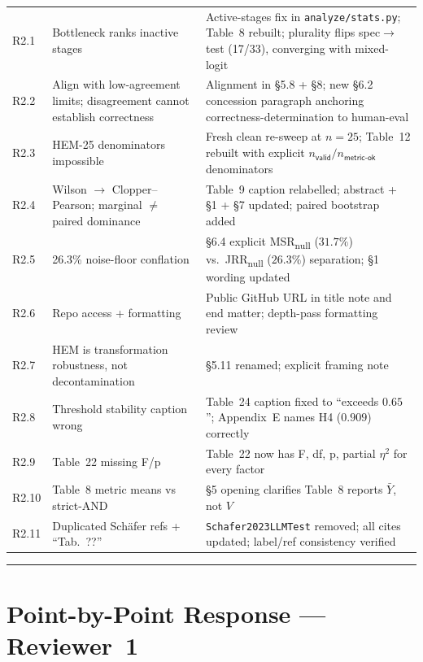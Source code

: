 \documentclass[11pt,a4paper]{article}
\begin{document}
\begin{tabular}{@{}p{0.6cm}p{5.8cm}p{9cm}@{}}
\addlinespace
R2.1 & Bottleneck ranks inactive stages & Active-stages fix in \texttt{analyze/stats.py}; Table~8 rebuilt; plurality flips spec$\to$test (17/33), converging with mixed-logit \\
R2.2 & Align with low-agreement limits; disagreement cannot establish correctness & Alignment in \S5.8 + \S8; new \S6.2 concession paragraph anchoring correctness-determination to human-eval \\
R2.3 & HEM-25 denominators impossible & Fresh clean re-sweep at $n = 25$; Table~12 rebuilt with explicit $n_{\textsf{valid}} / n_{\textsf{metric-ok}}$ denominators \\
R2.4 & Wilson $\to$ Clopper--Pearson; marginal $\ne$ paired dominance & Table~9 caption relabelled; abstract + \S1 + \S7 updated; paired bootstrap added \\
R2.5 & 26.3\% noise-floor conflation & \S6.4 explicit MSR\textsubscript{null} ($31.7\%$) vs.\ JRR\textsubscript{null} ($26.3\%$) separation; \S1 wording updated \\
R2.6 & Repo access + formatting & Public GitHub URL in title note and end matter; depth-pass formatting review \\
R2.7 & HEM is transformation robustness, not decontamination & \S5.11 renamed; explicit framing note \\
R2.8 & Threshold stability caption wrong & Table~24 caption fixed to ``exceeds $0.65$''; Appendix~E names H4 ($0.909$) correctly \\
R2.9 & Table~22 missing F/p & Table~22 now has F, df, p, partial $\eta^2$ for every factor \\
R2.10 & Table~8 metric means vs strict-AND & \S5 opening clarifies Table~8 reports $\bar{Y}$, not $V$ \\
R2.11 & Duplicated Schäfer refs + ``Tab.\ ??'' & \texttt{Schafer2023LLMTest} removed; all cites updated; label/ref consistency verified \\
\bottomrule
\end{tabular}

\vspace{1em}

\begin{center}\rule{0.7\textwidth}{0.4pt}\end{center}

\section*{Point-by-Point Response --- Reviewer~1}
\end{document}
